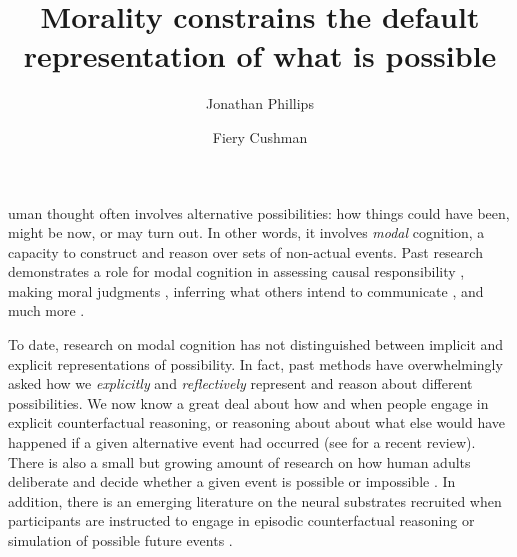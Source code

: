 \documentclass[9pt,twocolumn,twoside]{pnas-new}
\title{Morality constrains the default representation of what is possible}
\author[a,1]{Jonathan Phillips}
\author[a]{Fiery Cushman}
\affil[a]{Harvard University, Department of Psychology, William James Hall, 33 Kirkland Street, Cambridge, MA 02138}
\begin{document}
\verticaladjustment{-2pt}

\maketitle
\thispagestyle{firststyle}

uman thought often involves alternative possibilities: how things could have been, might be now, or may turn out. In other words, it involves \emph{modal} cognition, a capacity to construct and reason over sets of non-actual events. Past research demonstrates a role for modal cognition in assessing causal responsibility \citep{lewis2013counterfactuals,pearl2009causality,gerstenberg2016theories}, making moral judgments \citep{kane2011oxford,hart1985causation,lagnado2013causal}, inferring what others intend to communicate \citep{portner2009modality,kratzer2012modals,stalnaker2002common}, and much more \citep{phillips2015unifying}.

To date, research on modal cognition has not distinguished between implicit and explicit representations of possibility. In fact, past methods have overwhelmingly asked how we \textit{explicitly} and \textit{reflectively} represent and reason about different possibilities. We now know a great deal about how and when people engage in explicit counterfactual reasoning, or reasoning about about what else would have happened if a given alternative event had occurred (see \cite{byrne2016counterfactual} for a recent review). There is also a small but growing amount of research on how human adults deliberate and decide whether a given event is possible or impossible \cite{shtulman2013cognitive}. In addition, there is an emerging literature on the neural substrates recruited when participants are instructed to engage in episodic counterfactual reasoning or simulation of possible future events \cite{schacter2015episodic,de2015neural}.
\end{document}

